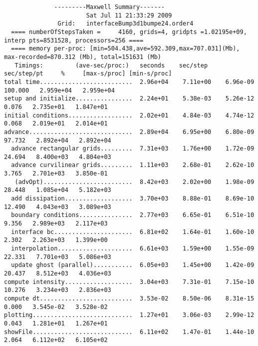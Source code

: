 {\footnotesize
\begin{verbatim}
              ---------Maxwell Summary------- 
                       Sat Jul 11 21:33:29 2009
               Grid:   interfaceBump3d1bumpe24.order4 
  ==== numberOfStepsTaken =     4160, grids=4, gridpts =1.02195e+09, interp pts=8531528, processors=256 ==== 
  ==== memory per-proc: [min=504.438,ave=592.309,max=707.031](Mb), max-recorded=870.312 (Mb), total=151631 (Mb)
   Timings:         (ave-sec/proc:)   seconds    sec/step   sec/step/pt     %     [max-s/proc] [min-s/proc]
total time..........................  2.96e+04    7.11e+00    6.96e-09   100.000   2.959e+04   2.959e+04
setup and initialize................  2.24e+01    5.38e-03    5.26e-12     0.076   2.735e+01   1.847e+01
initial conditions..................  2.02e+01    4.84e-03    4.74e-12     0.068   2.019e+01   2.014e+01
advance.............................  2.89e+04    6.95e+00    6.80e-09    97.732   2.892e+04   2.892e+04
  advance rectangular grids.........  7.31e+03    1.76e+00    1.72e-09    24.694   8.400e+03   4.804e+03
  advance curvilinear grids.........  1.11e+03    2.68e-01    2.62e-10     3.765   2.701e+03   3.850e-01
   (advOpt).........................  8.42e+03    2.02e+00    1.98e-09    28.448   1.085e+04   5.182e+03
  add dissipation...................  3.70e+03    8.88e-01    8.69e-10    12.490   4.043e+03   3.089e+03
  boundary conditions...............  2.77e+03    6.65e-01    6.51e-10     9.356   2.989e+03   2.117e+03
  interface bc......................  6.81e+02    1.64e-01    1.60e-10     2.302   2.263e+03   1.399e+00
  interpolation.....................  6.61e+03    1.59e+00    1.55e-09    22.331   7.701e+03   5.086e+03
  update ghost (parallel)...........  6.05e+03    1.45e+00    1.42e-09    20.437   8.512e+03   4.036e+03
compute intensity...................  3.04e+03    7.31e-01    7.15e-10    10.276   3.234e+03   2.836e+03
compute dt..........................  3.53e-02    8.50e-06    8.31e-15     0.000   3.545e-02   3.528e-02
plotting............................  1.27e+01    3.06e-03    2.99e-12     0.043   1.281e+01   1.267e+01
showFile............................  6.11e+02    1.47e-01    1.44e-10     2.064   6.112e+02   6.105e+02
\end{verbatim}
}


